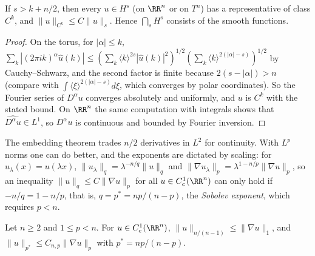 \begin{theorem}\label{distributions:theorem-sobolev-embedding}
If $s > k + n/2$, then every $u \in H^s$ (on $\RR^n$ or on $T^n$) has a representative of class $C^k$, and $\|u\|_{C^k} \leq C\|u\|_s$. Hence $\bigcap_sH^s$ consists of the smooth functions.
\end{theorem}

\begin{proof}
On the torus, for $|\alpha| \leq k$,
$\sum_k|(2\pi ik)^\alpha\hat u(k)| \leq \left(\sum_k\langle k\rangle^{2s}|\hat u(k)|^2\right)^{1/2}\left(\sum_k\langle k\rangle^{2(|\alpha| - s)}\right)^{1/2}$ by Cauchy--Schwarz, and the second factor is
finite because $2(s - |\alpha|) > n$ (compare with $\int\langle\xi\rangle^{2(|\alpha|-s)}d\xi$, which converges by polar coordinates). So the Fourier series of $D^\alpha u$ converges absolutely and
uniformly, and $u$ is $C^k$ with the stated bound. On $\RR^n$ the same computation with integrals shows that $\widehat{D^\alpha u} \in L^1$, so $D^\alpha u$ is continuous and bounded by Fourier inversion.
\end{proof}

The embedding theorem trades $n/2$ derivatives in $L^2$ for continuity. With $L^p$ norms one can do better, and the exponents are dictated by scaling: for $u_\lambda(x) = u(\lambda x)$,
$\|u_\lambda\|_q = \lambda^{-n/q}\|u\|_q$ and $\|\nabla u_\lambda\|_p = \lambda^{1 - n/p}\|\nabla u\|_p$, so an inequality $\|u\|_q \leq C\|\nabla u\|_p$ for all $u \in C_c^1(\RR^n)$ can only hold if
$-n/q = 1 - n/p$, that is, $q = p^* = np/(n - p)$, the \emph{Sobolev exponent}, which requires $p < n$.

\begin{theorem}\label{distributions:theorem-gns}
Let $n \geq 2$ and $1 \leq p < n$. For $u \in C_c^1(\RR^n)$, $\|u\|_{n/(n-1)} \leq \|\nabla u\|_1$, and $\|u\|_{p^*} \leq C_{n,p}\|\nabla u\|_p$ with $p^* = np/(n - p)$.
\end{theorem}

